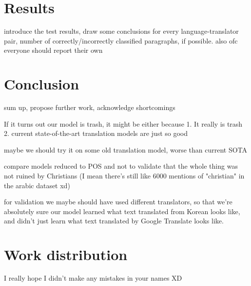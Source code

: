 \documentclass[twocolumn]{article}
\begin{document}
\section*{Results}

introduce the test results, draw some conclusions
for every language-translator pair, number of correctly/incorrectly classified paragraphs, if possible. also ofc everyone should report their own

\section*{Conclusion}

sum up, propose further work, acknowledge shortcomings

If it turns out our model is trash, it might be either because 1. It really is trash 2. current state-of-the-art translation models are just so good

maybe we should try it on some old translation model, worse than current SOTA

compare models reduced to POS and not to validate that the whole thing was not ruined by Christians (I mean there's still like 6000 mentions of "christian" in the arabic dataset xd)

for validation we maybe should have used different translators, so that we're absolutely sure our model learned what text translated from Korean looks like, and didn't just learn what text translated by Google Translate looks like.



\section*{Work distribution}

I really hope I didn't make any mistakes in your names XD
\end{document}
